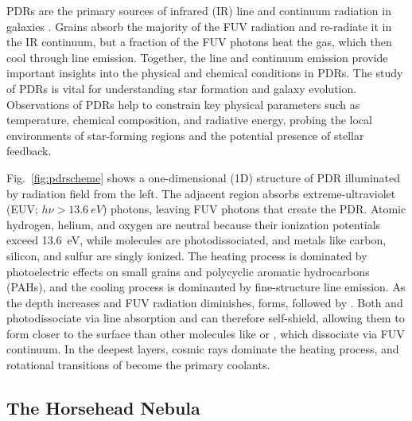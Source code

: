 \documentclass[12pt,a4paper]{article}
\begin{document}
PDRs are the primary sources of infrared (IR) line and continuum radiation in galaxies \parencite{Crawford1985,Stacey2010}. Grains absorb the majority of the FUV radiation and re-radiate it in the IR continuum, but a fraction of the FUV photons heat the gas, which then cool through line emission. Together, the line and continuum emission provide important insights into the physical and chemical conditions in PDRs. The study of PDRs is vital for understanding star formation and galaxy evolution. Observations of PDRs help to constrain key physical parameters such as temperature, chemical composition, and radiative energy, probing the local environments of star-forming regions and the potential presence of stellar feedback.

Fig.~\ref{fig:pdrscheme} shows a one-dimensional (1D) structure of PDR illuminated by radiation field from the left. The adjacent  region absorbs extreme-ultraviolet (EUV; $h\nu > \qty{13.6}{eV}$) photons, leaving FUV photons that create the PDR. Atomic hydrogen, helium, and oxygen are neutral because their ionization potentials exceed \qty{13.6}{eV}, while molecules are photodissociated, and metals like carbon, silicon, and sulfur are singly ionized. The heating process is dominated by photoelectric effects on small grains and polycyclic aromatic hydrocarbons (PAHs), and the cooling process is dominanted by fine-structure line emission. As the depth increases and FUV radiation diminishes,  forms, followed by . Both  and  photodissociate via line absorption and can therefore self-shield, allowing them to form closer to the surface than other molecules like  or , which dissociate via FUV continuum. In the deepest layers, cosmic rays dominate the heating process, and rotational transitions of  become the primary coolants.

\subsection{The Horsehead Nebula}
\end{document}
